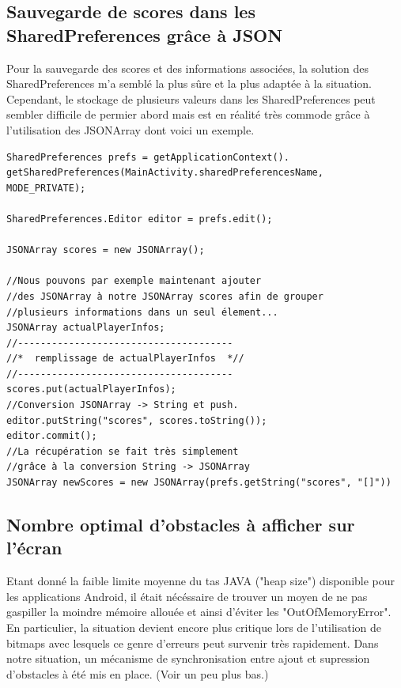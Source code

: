 \documentclass[12pt,a4paper,abstract=on,parskip=full]{scrartcl}
\begin{document}
\subsection{Sauvegarde de scores dans les SharedPreferences grâce à JSON}

Pour la sauvegarde des scores et des informations associées, la solution des SharedPreferences m'a semblé la plus sûre et la plus adaptée à la situation.
Cependant, le stockage de plusieurs valeurs dans les SharedPreferences peut sembler difficile de permier abord mais est en réalité très commode grâce à l'utilisation des JSONArray dont voici un exemple.

\begin{verbatim}
SharedPreferences prefs = getApplicationContext().
getSharedPreferences(MainActivity.sharedPreferencesName, MODE_PRIVATE);

SharedPreferences.Editor editor = prefs.edit();

JSONArray scores = new JSONArray();

//Nous pouvons par exemple maintenant ajouter 
//des JSONArray à notre JSONArray scores afin de grouper 
//plusieurs informations dans un seul élement...
JSONArray actualPlayerInfos;
//--------------------------------------
//*  remplissage de actualPlayerInfos  *//
//--------------------------------------
scores.put(actualPlayerInfos);
//Conversion JSONArray -> String et push.
editor.putString("scores", scores.toString());
editor.commit();
//La récupération se fait très simplement
//grâce à la conversion String -> JSONArray
JSONArray newScores = new JSONArray(prefs.getString("scores", "[]"))
\end{verbatim}

\subsection{Nombre optimal d'obstacles à afficher sur l'écran}

Etant donné la faible limite moyenne du tas JAVA ("heap size") disponible pour les applications Android, il était nécéssaire de trouver un moyen de ne pas gaspiller la moindre mémoire allouée et ainsi d'éviter les "OutOfMemoryError".
En particulier, la situation devient encore plus critique lors de l'utilisation de bitmaps avec lesquels ce genre d'erreurs peut survenir très rapidement.
Dans notre situation, un mécanisme de synchronisation entre ajout et supression
d'obstacles à été mis en place. (Voir un peu plus bas.)
\end{document}
